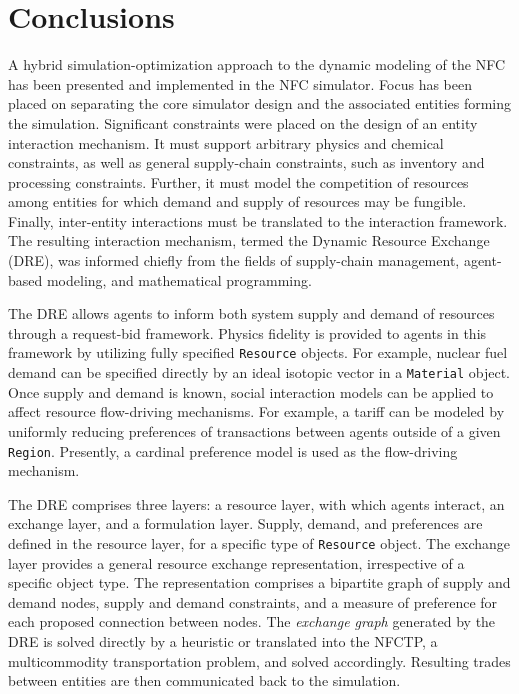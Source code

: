 \section{Conclusions}\label{sec:concl}

A hybrid simulation-optimization approach to the dynamic modeling of the NFC has
been presented and implemented in the \Cyclus NFC simulator. Focus has been
placed on separating the core simulator design and the associated entities
forming the simulation. Significant constraints were placed on the design of
an entity interaction mechanism. It must support arbitrary physics and chemical
constraints, as well as general supply-chain constraints, such as inventory and
processing constraints. Further, it must model the competition of resources
among entities for which demand and supply of resources may be
fungible. Finally, inter-entity interactions must be translated to the
interaction framework. The resulting interaction mechanism, termed the Dynamic
Resource Exchange (DRE), was informed chiefly from the fields of supply-chain
management, agent-based modeling, and mathematical programming.

The DRE allows agents to inform both system supply and demand of resources
through a request-bid framework. Physics fidelity is provided to agents in this
framework by utilizing fully specified \texttt{Resource} objects. For example,
nuclear fuel demand can be specified directly by an ideal isotopic vector in a
\texttt{Material} object. Once supply and demand is known, social interaction
models can be applied to affect resource flow-driving mechanisms. For example, a
tariff can be modeled by uniformly reducing preferences of transactions between
agents outside of a given \texttt{Region}. Presently, a cardinal preference
model is used as the flow-driving mechanism.

The DRE comprises three layers: a resource layer, with which agents
interact, an exchange layer, and a formulation layer. Supply, demand, and
preferences are defined in the resource layer, for a specific type of
\texttt{Resource} object. The exchange layer provides a general resource
exchange representation, irrespective of a specific object type. The
representation comprises a bipartite graph of supply and demand nodes,
supply and demand constraints, and a measure of preference for each proposed
connection between nodes. The \textit{exchange graph} generated by the DRE is
solved directly by a heuristic or translated into the NFCTP, a multicommodity
transportation problem, and solved accordingly. Resulting trades between
entities are then communicated back to the simulation.

